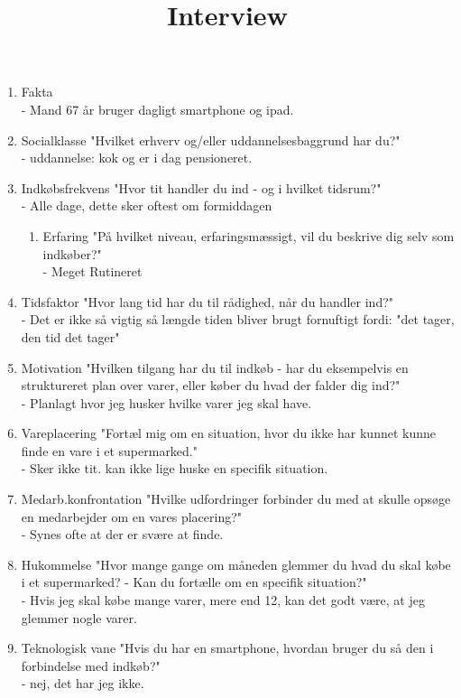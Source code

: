 \documentclass[a4paper,11pt]{report}
\title{Interview}
\begin{document}
\maketitle
 
\begin{enumerate}
\item Fakta\\
  - Mand 67 år bruger dagligt smartphone og ipad.
\item Socialklasse "Hvilket erhverv og/eller uddannelsesbaggrund har du?"\\
  - uddannelse: kok og er i dag pensioneret.
\item Indkøbsfrekvens "Hvor tit handler du ind - og i hvilket tidsrum?"\\
  - Alle dage, dette sker oftest om formiddagen
\begin{enumerate}
\item Erfaring	"På hvilket niveau, erfaringsmæssigt, vil du beskrive dig selv som indkøber?"\\
  - Meget Rutineret
\end{enumerate}
\item Tidsfaktor "Hvor lang tid har du til rådighed, når du handler ind?"\\
  - Det er ikke så vigtig så længde tiden bliver brugt fornuftigt fordi: "det tager, den tid det tager"
\item Motivation "Hvilken tilgang har du til indkøb - har du eksempelvis en struktureret plan over varer, eller køber du hvad der falder dig ind?"\\
  - Planlagt hvor jeg husker hvilke varer jeg skal have.
\item  Vareplacering "Fortæl mig om en situation, hvor du ikke har kunnet kunne finde en vare i et supermarked."\\
  - Sker ikke tit. kan ikke lige huske en specifik situation.
\item Medarb.konfrontation "Hvilke udfordringer forbinder du med at skulle opsøge en medarbejder om en vares placering?"\\
  - Synes ofte at der er svære at finde.
\item Hukommelse "Hvor mange gange om måneden glemmer du hvad du skal købe i et supermarked? - Kan du fortælle om en specifik situation?"\\
  - Hvis jeg skal købe mange varer, mere end 12, kan det godt være, at jeg glemmer nogle varer.
\item Teknologisk vane "Hvis du har en smartphone, hvordan bruger du så den i forbindelse med indkøb?"\\
  - nej, det har jeg ikke.


\end{enumerate}
\end{document}
